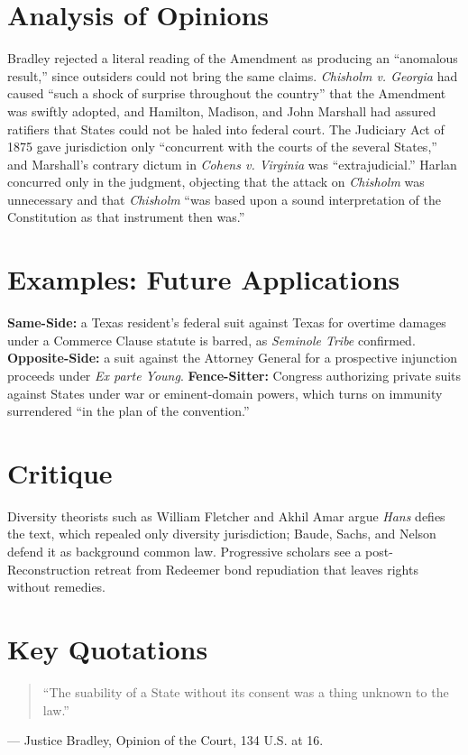 \documentclass[12pt]{article}
\begin{document}
\section{Analysis of Opinions}
Bradley rejected a literal reading of the Amendment as producing an ``anomalous result,'' since outsiders could not bring the same claims. \textit{Chisholm v. Georgia} had caused ``such a shock of surprise throughout the country'' that the Amendment was swiftly adopted, and Hamilton, Madison, and John Marshall had assured ratifiers that States could not be haled into federal court. The Judiciary Act of 1875 gave jurisdiction only ``concurrent with the courts of the several States,'' and Marshall's contrary dictum in \textit{Cohens v. Virginia} was ``extrajudicial.'' Harlan concurred only in the judgment, objecting that the attack on \textit{Chisholm} was unnecessary and that \textit{Chisholm} ``was based upon a sound interpretation of the Constitution as that instrument then was.''

\section{Examples: Future Applications}
\textbf{Same-Side:} a Texas resident's federal suit against Texas for overtime damages under a Commerce Clause statute is barred, as \textit{Seminole Tribe} confirmed. \textbf{Opposite-Side:} a suit against the Attorney General for a prospective injunction proceeds under \textit{Ex parte Young}. \textbf{Fence-Sitter:} Congress authorizing private suits against States under war or eminent-domain powers, which turns on immunity surrendered ``in the plan of the convention.''

\section{Critique}
Diversity theorists such as William Fletcher and Akhil Amar argue \textit{Hans} defies the text, which repealed only diversity jurisdiction; Baude, Sachs, and Nelson defend it as background common law. Progressive scholars see a post-Reconstruction retreat from Redeemer bond repudiation that leaves rights without remedies.

\section{Key Quotations}
\begin{quote}
``The suability of a State without its consent was a thing unknown to the law.''
\end{quote}
\noindent --- Justice Bradley, Opinion of the Court, 134 U.S. at 16.
\end{document}
